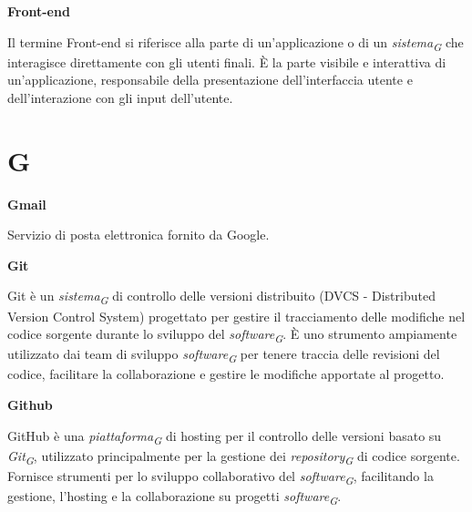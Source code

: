 \documentclass{article}
\begin{document}
\vspace{0.4cm}

\textbf{Front-end}

\vspace{0.1cm}

Il termine Front-end si riferisce alla parte di un'applicazione o di un \textit{sistema}\textsubscript{\textit{G}} che interagisce direttamente con gli utenti finali. È la parte visibile e interattiva di un'applicazione, responsabile della presentazione dell'interfaccia utente e dell'interazione con gli input dell'utente.

\pagebreak
\section*{G}
{}

\vspace{0.4cm}

\textbf{Gmail}

\vspace{0.1cm}

Servizio di posta elettronica fornito da Google.

\vspace{0.4cm}

\textbf{Git}

\vspace{0.1cm}

Git è un \textit{sistema}\textsubscript{\textit{G}} di controllo delle versioni distribuito (DVCS - Distributed Version Control System) progettato per gestire il tracciamento delle modifiche nel codice sorgente durante lo sviluppo del \textit{software}\textsubscript{\textit{G}}. È uno strumento ampiamente utilizzato dai team di sviluppo \textit{software}\textsubscript{\textit{G}} per tenere traccia delle revisioni del codice, facilitare la collaborazione e gestire le modifiche apportate al progetto.

\vspace{0.4cm}

\textbf{Github}

\vspace{0.1cm}

GitHub è una \textit{piattaforma}\textsubscript{\textit{G}} di hosting per il controllo delle versioni basato su \textit{Git}\textsubscript{\textit{G}}, utilizzato principalmente per la gestione dei \textit{repository}\textsubscript{\textit{G}} di codice sorgente. Fornisce strumenti per lo sviluppo collaborativo del \textit{software}\textsubscript{\textit{G}}, facilitando la gestione, l'hosting e la collaborazione su progetti \textit{software}\textsubscript{\textit{G}}.
\end{document}
